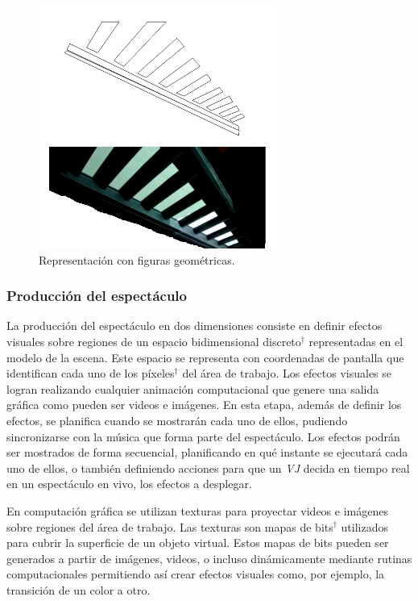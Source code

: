 \begin{figure}[H]
  \centering
	\includegraphics[width=0.7\textwidth]{./Cap2_videomapping/RepresentacionconfigurasGeometricas}
  \caption[Imagen propia]{Representación con figuras geométricas.}
  \label{fig:RepresentacionconfigurasGeometricas}
\end{figure}

\subsubsection{Producción del espectáculo}
La producción del espectáculo en dos dimensiones consiste en definir efectos visuales sobre regiones de un espacio bidimensional discreto$^\dagger$ representadas en el modelo de la escena. Este espacio se representa con coordenadas de pantalla que identifican cada uno de los píxeles$^\dagger$ del área de trabajo. Los efectos visuales se logran realizando cualquier animación computacional que genere una salida gráfica como pueden ser videos e imágenes.
En esta etapa, además de definir los efectos, se planifica cuando se mostrarán cada uno de ellos, pudiendo sincronizarse con la música que forma parte del espectáculo.
Los efectos podrán ser mostrados de forma secuencial, planificando en qué instante se ejecutará cada uno de ellos, o también definiendo acciones para que un \emph{VJ} decida en tiempo real en un espectáculo en vivo, los efectos a desplegar.

En computación gráfica se utilizan texturas para proyectar videos e imágenes sobre regiones del área de trabajo. Las texturas son mapas de bits$^\dagger$ utilizados para cubrir la superficie de un objeto virtual. Estos mapas de bits pueden ser generados a partir de imágenes, videos, o incluso dinámicamente mediante rutinas computacionales permitiendo así crear efectos visuales como, por ejemplo, la transición de un color a otro.

